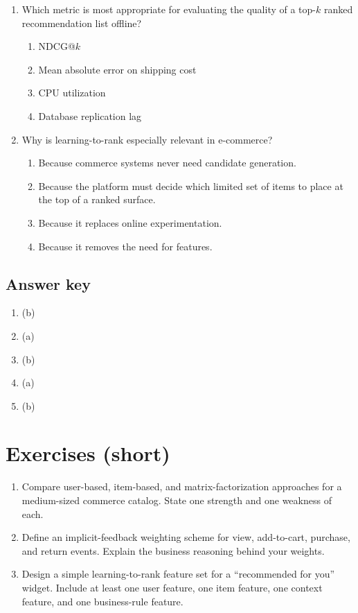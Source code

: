 \begin{enumerate}
  \item Which metric is most appropriate for evaluating the quality of a top-$k$ ranked recommendation list offline?
  \begin{enumerate}
    \item NDCG@$k$
    \item Mean absolute error on shipping cost
    \item CPU utilization
    \item Database replication lag
  \end{enumerate}

  \item Why is learning-to-rank especially relevant in e-commerce?
  \begin{enumerate}
    \item Because commerce systems never need candidate generation.
    \item Because the platform must decide which limited set of items to place at the top of a ranked surface.
    \item Because it replaces online experimentation.
    \item Because it removes the need for features.
  \end{enumerate}
\end{enumerate}

\subsection*{Answer key}
\begin{enumerate}
  \item (b)
  \item (a)
  \item (b)
  \item (a)
  \item (b)
\end{enumerate}

\section{Exercises (short)}
\begin{enumerate}
  \item Compare user-based, item-based, and matrix-factorization approaches for a medium-sized commerce catalog. State one strength and one weakness of each.
  \item Define an implicit-feedback weighting scheme for view, add-to-cart, purchase, and return events. Explain the business reasoning behind your weights.
  \item Design a simple learning-to-rank feature set for a ``recommended for you'' widget. Include at least one user feature, one item feature, one context feature, and one business-rule feature.
\end{enumerate}

